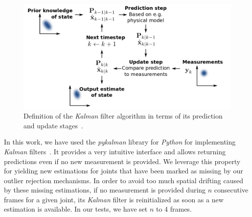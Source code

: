 \begin{figure}[h]
    \centering
    \includegraphics[width=\textwidth]{figures/kalman.png}
    \caption{Definition of the \emph{Kalman} filter algorithm in terms of its prediction and update stages~\cite{petteri_2011}.}
    \label{fig:kalman}
\end{figure}

In this work, we have used the \emph{pykalman} library for \emph{Python} for implementing \emph{Kalman} filters~\cite{pykalman}. It provides a very intuitive interface and allows returning predictions even if no new measurement is provided. We leverage this property for yielding new estimations for joints that have been marked as missing by our outlier rejection mechanisms. In order to avoid too much spatial drifting caused by these missing estimations, if no measurement is provided during \(n\) consecutive frames for a given joint, its \emph{Kalman} filter is reinitialized as soon as a new estimation is available. In our tests, we have set \(n\) to 4 frames.